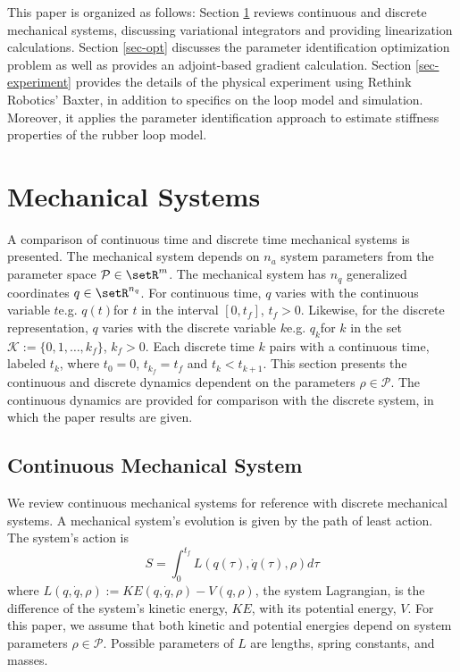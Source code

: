 \documentclass[letterpaper, 10pt, conference]{ieeeconf}
\begin{document}
This paper is organized as follows: Section \ref{sec-sys} reviews continuous and discrete mechanical systems, discussing variational integrators and providing linearization calculations.  Section \ref{sec-opt} discusses the parameter identification optimization problem as well as provides an adjoint-based gradient calculation.  Section \ref{sec-experiment} provides the details of the physical experiment using Rethink Robotics' Baxter, in addition to specifics on the loop model and simulation.  Moreover, it applies the parameter identification approach to estimate stiffness properties of the rubber loop model.

\section{Mechanical Systems}
\label{sec-sys}
A comparison of continuous time and discrete time mechanical systems is presented.  The mechanical system depends on $n_a$ system parameters from the parameter space $\mathcal{P}\in\setR^m$. The mechanical system has $n_q$ generalized coordinates $q\in\setR^{n_q}$.  For continuous time, $q$ varies with the continuous variable $t$\textemdash e.g. $q(t)$\textemdash for $t$ in the interval $[0,t_f]$, $t_f>0$.  Likewise, for the discrete representation, $q$ varies with the discrete variable $k$\textemdash e.g. $q_k$\textemdash for $k$ in the set $\mathcal{K}:=\{0,1,\ldots,k_f\}$, $k_f>0$.  Each discrete time $k$ pairs with a continuous time, labeled $t_k$, where $t_0 = 0$, $t_{k_f} = t_f$ and $t_k<t_{k+1}$. This section presents the continuous and discrete dynamics dependent on the parameters $\rho\in\mathcal{P}$.  The continuous dynamics are provided for comparison with the discrete system, in which the paper results are given.

\subsection{Continuous Mechanical System}
We review continuous mechanical systems for reference with discrete mechanical systems.  A mechanical system's evolution is given by the path of least action.  The system's action is 
\[
S = \int_0^{t_f}L(q(\tau),\dot{q}(\tau),\rho)d\tau
\]
where $L(q,\dot{q},\rho) := KE(q,\dot{q},\rho) - V(q,\rho)$, the system Lagrangian, is the difference of the system's kinetic energy, $KE$, with its potential energy, $V$.  For this paper, we assume that both kinetic and potential energies depend on system parameters $\rho\in\mathcal{P}$.  Possible parameters of $L$ are lengths, spring constants, and masses. 
\end{document}
